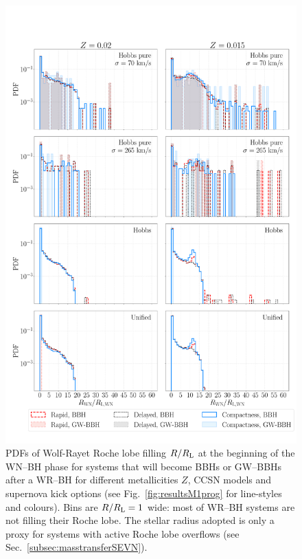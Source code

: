 \documentclass[a4paper,titlepage]{book}     	%
\begin{document}
\begin{figure}[h!]
	\centering
	\includegraphics[width=\textwidth]{./images/WRBH-RLfillWRnonpureHe.pdf}	
	\caption{PDFs of Wolf-Rayet Roche lobe filling $R/R_{\rm L}$ at the beginning of the WN--BH phase for systems that will become BBHs or GW--BBHs after a WR--BH for different metallicities $Z$, CCSN models and supernova kick options (see Fig.\ \ref{fig:resultsM1prog} for line-styles and colours). Bins are $R/R_{\rm L} = 1$ wide: most of WR--BH systems are not filling their Roche lobe. The stellar radius adopted is only a proxy for systems with active Roche lobe overflows (see Sec.\ \ref{subsec:masstransferSEVN}).}\label{fig:resultsWRBH-RLfillnonpureHe}
\end{figure}
\end{document}
